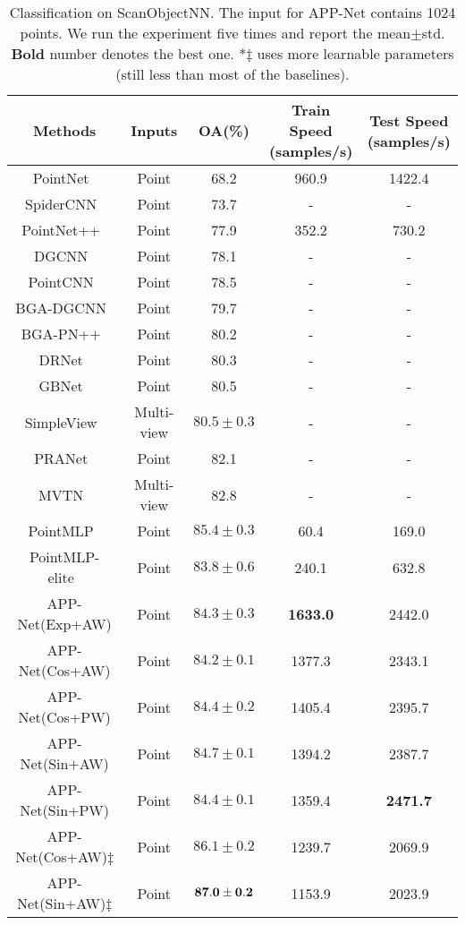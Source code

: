 \documentclass[journal]{IEEEtran}
\begin{document}
\begin{table*}[t]\begin{center}
\caption{Classification on ScanObjectNN. The input for APP-Net contains 1024 points. We run the experiment five times and report the mean$\pm$std. {\bf Bold} number denotes the best one. *$\ddag$ uses more learnable parameters (still less than most of the baselines). }\label{tab:sonn}
\vspace{0.2cm}
\begin{tabular}{c|c|c|cc}
\hline
Methods      & Inputs  & OA(\%) &\makecell[c]{Train Speed\\(samples/s)} &\makecell[c]{Test Speed\\(samples/s)}\\ \hline
PointNet~\cite{PointNet}   & Point                      & 68.2  &960.9& 1422.4 \\
SpiderCNN~\cite{xu2018spidercnn} &Point&73.7&-&-\\
PointNet++~\cite{PointNet++} &Point&77.9&352.2&730.2\\
DGCNN~\cite{DGCNN} &Point& 78.1&-&-\\
PointCNN~\cite{pointcnn}&Point&78.5&-&-\\
BGA-DGCNN~\cite{uy2019revisiting}&Point&79.7&-&-\\
BGA-PN++~\cite{uy2019revisiting}&Point&80.2&-&-\\
DRNet~\cite{qiu2021dense}&Point&80.3&-&-\\
GBNet~\cite{qiu2021geometric}&Point&80.5&-&-\\
SimpleView~\cite{goyal2021revisiting}&Multi-view&$80.5\pm0.3$&-&-\\
PRANet~\cite{cheng2021net}&Point&82.1&-&-\\
MVTN~\cite{hamdi2021mvtn}&Multi-view&82.8&-&-\\
PointMLP~\cite{ma2022rethinking}&Point&$85.4\pm0.3$&60.4&169.0\\
PointMLP-elite~\cite{ma2022rethinking}&Point&$83.8\pm0.6$&240.1&632.8\\
\hline
APP-Net(Exp+AW)&Point&$84.3\pm0.3$&{\bf1633.0}&2442.0\\
APP-Net(Cos+AW)&Point&$84.2\pm0.1$&1377.3&2343.1\\
APP-Net(Cos+PW)&Point&$84.4\pm0.2$&1405.4&2395.7\\
APP-Net(Sin+AW)&Point&$84.7\pm0.1$&1394.2&2387.7\\
APP-Net(Sin+PW)&Point&$84.4\pm0.1$&1359.4&{\bf2471.7}\\
APP-Net(Cos+AW){$\ddag$}&Point&$86.1\pm0.2$&1239.7&2069.9\\
APP-Net(Sin+AW){$\ddag$}&Point&${\bf87.0\pm0.2}$&1153.9&2023.9\\
\hline
\end{tabular}
\end{center}
\end{table*}
\end{document}
